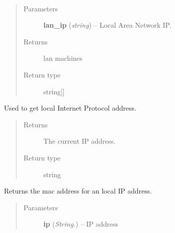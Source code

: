 \documentclass[letterpaper,10pt,english]{sphinxmanual}
\begin{document}

\begin{fulllineitems}
\label{utils:utils.GetLANMachines}~\begin{quote}\begin{description}
\item[{Parameters}] \leavevmode
\textbf{lan\_ip} (\emph{string}) -- Local Area Network IP.

\item[{Returns}] \leavevmode
lan machines

\item[{Return type}] \leavevmode
string{[}{]}

\end{description}\end{quote}

\end{fulllineitems}


\begin{fulllineitems}
\label{utils:utils.GetLocalIPAddress}
Used to get local Internet Protocol address.
\begin{quote}\begin{description}
\item[{Returns}] \leavevmode
The current IP address.

\item[{Return type}] \leavevmode
string

\end{description}\end{quote}

\end{fulllineitems}


\begin{fulllineitems}
\label{utils:utils.GetMacForIp}
Returns the mac address for an local IP address.
\begin{quote}\begin{description}
\item[{Parameters}] \leavevmode
\textbf{ip} (\emph{String.}) -- IP address

\end{description}\end{quote}

\end{fulllineitems}
\end{document}
